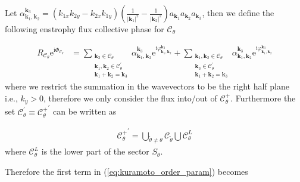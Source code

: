 \documentclass[9pt]{article}
\newcommand{\triad}[3]{\varphi_{#1, #2}^{#3}}                     %
\newcommand{\ii}{\mathrm{i}}      								  %
\newcommand{\e}{\mathrm{e}}      								  %
\newcommand{\alphakkk}[3]{\alpha_{\bfkn{#1}, \bfkn{#2}}^{\bfkn{#3}}}
\newcommand{\bfkn}[1]{\mathbf{k}_{#1}}								%
\begin{document}
Let $\alpha_{\bfkn{1}, \bfkn{2}}^{\bfkn{3}} = \left(k_{1 x} k_{2 y}-k_{2 x} k_{1 y}\right)\left(\frac{1}{\left|\mathbf{k}_{1}\right|^{2}}-\frac{1}{\left|\mathbf{k}_{2}\right|^{2}}\right) a_{\mathbf{k}_{1}} a_{\mathbf{k}_{2}} a_{\mathbf{k}_{3}}$, then we define the following enstrophy flux collective phase for $\mathcal{C}_\theta$

\begin{align}
R_{\mathcal{C}_\theta}\e^{\ii\Phi_{\mathcal{C}_{\theta}}} &= \sum_{\substack{\bfkn{3} \in \mathcal{C}_{\theta} \\ \bfkn{1},  \bfkn{2} \in \mathcal{C}_{\theta}^{'} \\ \bfkn{1} + \bfkn{2} = \bfkn{3}}} \alphakkk{{1}}{2}{3}\e^{\ii \triad{\bfkn{1}}{\bfkn{2}}{\bfkn{3}}} + \sum_{\substack{\bfkn{1}, \bfkn{2} \in \mathcal{C}_{\theta} \\ \bfkn{3} \in \mathcal{C}_{\theta}^{'} \\ \bfkn{1} + \bfkn{2} = \bfkn{3}}} \alphakkk{{1}}{2}{3}\e^{\ii \triad{\bfkn{1}}{\bfkn{2}}{\bfkn{3}}} 
\label{eq:kuramoto_order_param}
\end{align}
where we restrict the summation in the wavevectors to be the right half plane i.e., $k_y > 0$, therefore we only consider the flux into/out of $\mathcal{C}_{\theta}^{+}$. Furthermore the set $\mathcal{C}_{\theta}^{'} \equiv {\mathcal{C}_{\theta}^{+}}^{'}$ can be written as

\begin{align}
	{\mathcal{C}_{\theta}^{+}}^{'} = \bigcup_{\tilde{\theta} \neq \theta} \mathcal{C}_{\tilde{\theta}} \bigcup \mathcal{C}_{\theta}^{L}
\end{align}
where $\mathcal{C}_{\theta}^{L}$ is the lower part of the sector $S_{\theta}$.

Therefore the first term in (\ref{eq:kuramoto_order_param}) becomes
\end{document}

